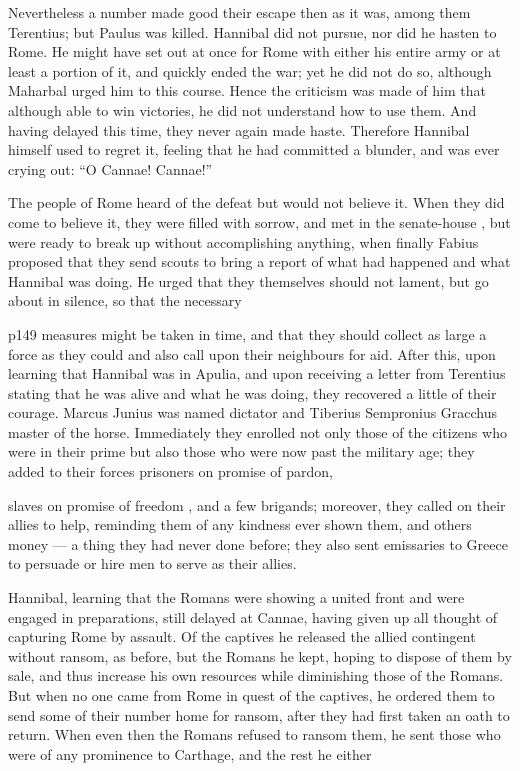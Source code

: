 Nevertheless a number made good their escape then as it was, among them Terentius; but Paulus was killed. Hannibal did not pursue, nor did he hasten to Rome. He might have set out at once for Rome with either his entire army or at least a portion of it, and quickly ended the war; yet he did not do so, although Maharbal urged him to this course. Hence the criticism was made of him that although able to win victories, he did not understand how to use them. And having delayed this time, they never again made haste. Therefore Hannibal himself used to regret it, feeling that he had committed a blunder, and was ever crying out: ``O Cannae! Cannae!''

The people of Rome heard of the defeat but would not believe it. When they did come to believe it, they were filled with sorrow, and met in the senate-house , but were ready to break up without accomplishing anything, when finally Fabius proposed that they send scouts to bring a report of what had happened and what Hannibal was doing. He urged that they themselves should not lament, but go about in silence, so that the necessary

p149 measures might be taken in time, and that they should collect as large a force as they could and also call upon their neighbours for aid. After this, upon learning that Hannibal was in Apulia, and upon receiving a letter from Terentius stating that he was alive and what he was doing, they recovered a little of their courage. Marcus Junius was named dictator and Tiberius Sempronius Gracchus master of the horse. Immediately they enrolled not only those of the citizens who were in their prime but also those who were now past the military age; they added to their forces prisoners on promise of pardon,

slaves on promise of freedom , and a few brigands; moreover, they called on their allies to help, reminding them of any kindness ever shown them, and others money \texthebrew{—} a thing they had never done before; they also sent emissaries to Greece to persuade or hire men to serve as their allies.

Hannibal, learning that the Romans were showing a united front and were engaged in preparations, still delayed at Cannae, having given up all thought of capturing Rome by assault. Of the captives he released the allied contingent without ransom, as before, but the Romans he kept, hoping to dispose of them by sale, and thus increase his own resources while diminishing those of the Romans. But when no one came from Rome in quest of the captives, he ordered them to send some of their number home for ransom, after they had first taken an oath to return. When even then the Romans refused to ransom them, he sent those who were of any prominence to Carthage, and the rest he either

